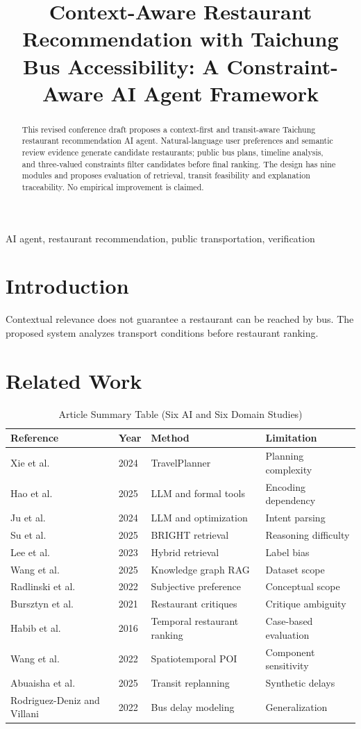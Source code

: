 \documentclass[conference]{IEEEtran}
\title{Context-Aware Restaurant Recommendation with Taichung Bus Accessibility: A Constraint-Aware AI Agent Framework}
\author{\IEEEauthorblockN{Jin-De Lin, Yan-Zhe Gu, Yu-Jie Wei, and Chun-Yu Yeh}\IEEEauthorblockA{National Chung Hsing University}}
\begin{document}
\maketitle
\begin{abstract}This revised conference draft proposes a context-first and transit-aware Taichung restaurant recommendation AI agent. Natural-language user preferences and semantic review evidence generate candidate restaurants; public bus plans, timeline analysis, and three-valued constraints filter candidates before final ranking. The design has nine modules and proposes evaluation of retrieval, transit feasibility and explanation traceability. No empirical improvement is claimed.\end{abstract}
\begin{IEEEkeywords}AI agent, restaurant recommendation, public transportation, verification\end{IEEEkeywords}
\section{Introduction}Contextual relevance does not guarantee a restaurant can be reached by bus. The proposed system analyzes transport conditions before restaurant ranking.
\section{Related Work}
\begin{table}[t]\caption{Article Summary Table (Six AI and Six Domain Studies)}\centering\small
\begin{tabular}{llll} \toprule Reference & Year & Method & Limitation \\ \midrule
Xie et al. & 2024 & TravelPlanner & Planning complexity \\
Hao et al. & 2025 & LLM and formal tools & Encoding dependency \\
Ju et al. & 2024 & LLM and optimization & Intent parsing \\
Su et al. & 2025 & BRIGHT retrieval & Reasoning difficulty \\
Lee et al. & 2023 & Hybrid retrieval & Label bias \\
Wang et al. & 2025 & Knowledge graph RAG & Dataset scope \\ \midrule
Radlinski et al. & 2022 & Subjective preference & Conceptual scope \\
Bursztyn et al. & 2021 & Restaurant critiques & Critique ambiguity \\
Habib et al. & 2016 & Temporal restaurant ranking & Case-based evaluation \\
Wang et al. & 2022 & Spatiotemporal POI & Component sensitivity \\
Abuaisha et al. & 2025 & Transit replanning & Synthetic delays \\
Rodriguez-Deniz and Villani & 2022 & Bus delay modeling & Generalization \\ \bottomrule
\end{tabular}\end{table}
\end{document}
